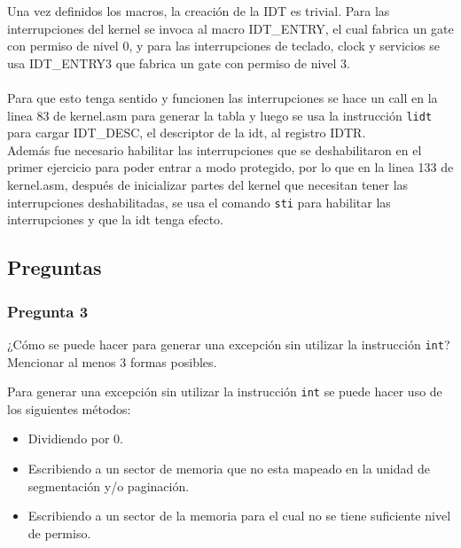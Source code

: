 \documentclass[10pt, a4paper]{article}
\begin{document}
Una vez definidos los macros, la creación de la IDT es trivial. Para las interrupciones del kernel se invoca al macro IDT\_ENTRY, el cual fabrica un gate con permiso de nivel 0, y para las interrupciones de teclado, clock y servicios se usa IDT\_ENTRY3 que fabrica un gate con permiso de nivel 3.
\\\\
Para que esto tenga sentido y funcionen las interrupciones se hace un call en la linea 83 de kernel.asm para generar la tabla y luego se usa la instrucción \texttt{lidt} para cargar IDT\_DESC, el descriptor de la idt, al registro IDTR.\\
Además fue necesario habilitar las interrupciones que se deshabilitaron en el primer ejercicio para poder entrar a modo protegido, por lo que en la linea 133 de kernel.asm, después de inicializar partes del kernel que necesitan tener las interrupciones deshabilitadas, se usa el comando \texttt{sti} para habilitar las interrupciones y que la idt tenga efecto.
\subsection{Preguntas}
\subsubsection*{Pregunta 3}
 \begin{framed}
¿Cómo se puede hacer para generar una excepción sin utilizar la instrucción \texttt{int}? Mencionar al menos 3 formas posibles.
\end{framed}
Para generar una excepción sin utilizar la instrucción \texttt{int} se puede hacer uso de los siguientes métodos:
\begin{itemize}
	\item Dividiendo por 0.
	\item Escribiendo a un sector de memoria que no esta mapeado en la unidad de segmentación y/o paginación.
	\item Escribiendo a un sector de la memoria para el cual no se tiene suficiente nivel de permiso.
\end{itemize}
\end{document}
